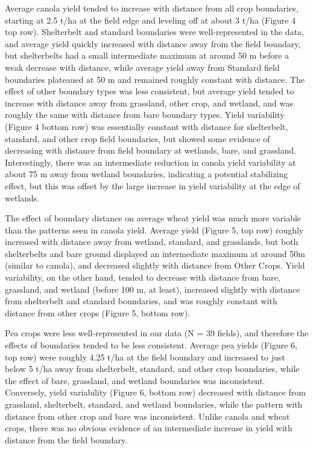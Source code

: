 \documentclass[]{elsarticle} %
\begin{document}
Average canola yield tended to increase with distance from all crop boundaries, starting at 2.5 t/ha at the field edge and leveling off at about 3 t/ha (Figure 4 top row).
Shelterbelt and standard boundaries were well-represented in the data, and average yield quickly increased with distance away from the field boundary, but shelterbelts had a small intermediate maximum at around 50 m before a weak decrease with distance, while average yield away from Standard field boundaries plateaued at 50 m and remained roughly constant with distance.
The effect of other boundary types was less consistent, but average yield tended to increase with distance away from grassland, other crop, and wetland, and was roughly the same with distance from bare boundary types.
Yield variability (Figure 4 bottom row) was essentially constant with distance for shelterbelt, standard, and other crop field boundaries, but showed some evidence of decreasing with distance from field boundary at wetlands, bare, and grassland.
Interestingly, there was an intermediate reduction in canola yield variability at about 75 m away from wetland boundaries, indicating a potential stabilizing effect, but this was offset by the large increase in yield variability at the edge of wetlands.

The effect of boundary distance on average wheat yield was much more variable than the patterns seen in canola yield.
Average yield (Figure 5, top row) roughly increased with distance away from wetland, standard, and grasslands, but both shelterbelts and bare ground displayed an intermediate maximum at around 50m (similar to canola), and decreased slightly with distance from Other Crops.
Yield variability, on the other hand, tended to decrease with distance from bare, grassland, and wetland (before 100 m, at least), increased slightly with distance from shelterbelt and standard boundaries, and was roughly constant with distance from other crops (Figure 5, bottom row).

Pea crops were less well-represented in our data (N = 39 fields), and therefore the effects of boundaries tended to be less consistent.
Average pea yields (Figure 6, top row) were roughly 4.25 t/ha at the field boundary and increased to just below 5 t/ha away from shelterbelt, standard, and other crop boundaries, while the effect of bare, grassland, and wetland boundaries was inconsistent.
Conversely, yield variability (Figure 6, bottom row) decreased with distance from grassland, shelterbelt, standard, and wetland boundaries, while the pattern with distance from other crop and bare was inconsistent.
Unlike canola and wheat crops, there was no obvious evidence of an intermediate increase in yield with distance from the field boundary.
\end{document}
